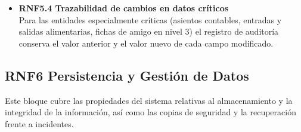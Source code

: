 \begin{itemize}
    \item \textbf{RNF5.4 Trazabilidad de cambios en datos críticos} \\
    Para las entidades especialmente críticas (asientos contables,
    entradas y salidas alimentarias, fichas de amigo en nivel 3) el
    registro de auditoría conserva el valor anterior y el valor nuevo
    de cada campo modificado.
\end{itemize}



\subsection{RNF6 Persistencia y Gestión de Datos}
Este bloque cubre las propiedades del sistema relativas al almacenamiento
y la integridad de la información, así como las copias de seguridad y la
recuperación frente a incidentes.
